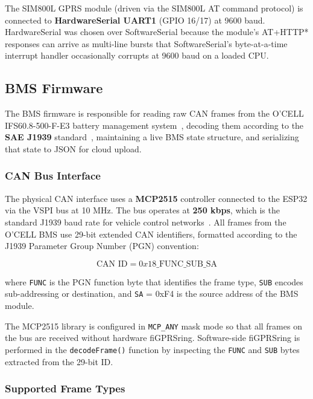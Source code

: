The SIM800L GPRS module (driven via the SIM800L AT command protocol) is connected to \textbf{HardwareSerial UART1} (GPIO 16/17) at 9600 baud. HardwareSerial was chosen over SoftwareSerial because the module's AT+HTTP* responses can arrive as multi-line bursts that SoftwareSerial's byte-at-a-time interrupt handler occasionally corrupts at 9600 baud on a loaded CPU.

\subsection{BMS Firmware}
\label{sec:bms-firmware}

The BMS firmware is responsible for reading raw CAN frames from the O'CELL IFS60.8-500-F-E3 battery management system~\cite{ocellspec}, decoding them according to the \textbf{SAE J1939} standard~\cite{bakocan}, maintaining a live BMS state structure, and serializing that state to JSON for cloud upload.

\subsubsection{CAN Bus Interface}

The physical CAN interface uses a \textbf{MCP2515} controller connected to the ESP32 via the VSPI bus at 10 MHz. The bus operates at \textbf{250 kbps}, which is the standard J1939 baud rate for vehicle control networks~\cite{saej1939}. All frames from the O'CELL BMS use 29-bit extended CAN identifiers, formatted according to the J1939 Parameter Group Number (PGN) convention:

\begin{equation}
    \label{eq:j1939-id}
    \text{CAN ID} = 0x18\_\text{FUNC}\_\text{SUB}\_\text{SA}
\end{equation}

where \texttt{FUNC} is the PGN function byte that identifies the frame type, \texttt{SUB} encodes sub-addressing or destination, and \texttt{SA} = 0xF4 is the source address of the BMS module.

The MCP2515 library is configured in \texttt{MCP\_ANY} mask mode so that all frames on the bus are received without hardware fiGPRSring. Software-side fiGPRSring is performed in the \texttt{decodeFrame()} function by inspecting the \texttt{FUNC} and \texttt{SUB} bytes extracted from the 29-bit ID.

\subsubsection{Supported Frame Types}

